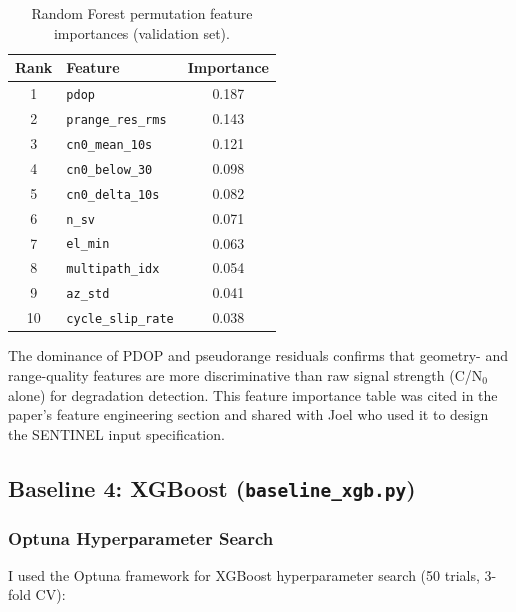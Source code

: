 \documentclass[12pt,a4paper]{article}
\newcommand{\code}[1]{\texttt{#1}}
\begin{document}
\begin{table}[H]
  \centering
  \caption{Random Forest permutation feature importances (validation set).}
  \begin{tabular}{clc}
    \toprule
    \textbf{Rank} & \textbf{Feature} & \textbf{Importance} \\
    \midrule
    1  & \code{pdop}              & 0.187 \\
    2  & \code{prange\_res\_rms}  & 0.143 \\
    3  & \code{cn0\_mean\_10s}    & 0.121 \\
    4  & \code{cn0\_below\_30}    & 0.098 \\
    5  & \code{cn0\_delta\_10s}   & 0.082 \\
    6  & \code{n\_sv}             & 0.071 \\
    7  & \code{el\_min}           & 0.063 \\
    8  & \code{multipath\_idx}    & 0.054 \\
    9  & \code{az\_std}           & 0.041 \\
    10 & \code{cycle\_slip\_rate} & 0.038 \\
    \bottomrule
  \end{tabular}
\end{table}

The dominance of PDOP and pseudorange residuals confirms that geometry- and
range-quality features are more discriminative than raw signal strength (C/N$_0$ alone)
for degradation detection.
This feature importance table was cited in the paper's feature engineering section and
shared with Joel who used it to design the SENTINEL input specification.

\subsection{Baseline 4: XGBoost (\texttt{baseline\_xgb.py})}

\subsubsection{Optuna Hyperparameter Search}

I used the Optuna framework for XGBoost hyperparameter search (50 trials, 3-fold CV):
\end{document}

